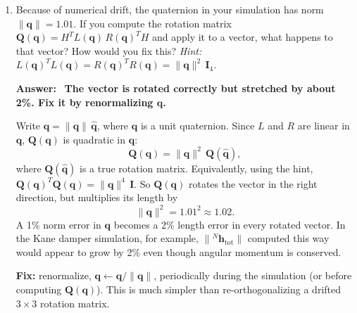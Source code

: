 \documentclass[11pt,letterpaper]{article}
\newenvironment{answer}{\par\vspace{4pt}\color{blue!60!black}\textbf{Answer:}\ }{\par\vspace{4pt}}
\begin{document}
\begin{enumerate}[label=\textbf{\arabic*.}, leftmargin=*, itemsep=4pt]
\begin{answer}
A unit quaternion must satisfy only $\lVert\mathbf{q}\rVert = 1$, a single constraint, leaving $4 - 1 = 3$ degrees of freedom.

Both match the 3 degrees of freedom of a rigid-body rotation. The quaternion is more compact and has only one constraint to maintain numerically.
\end{answer}

\item Because of numerical drift, the quaternion in your simulation has norm $\lVert\mathbf{q}\rVert = 1.01$. If you compute the rotation matrix $\mathbf{Q}(\mathbf{q}) = H^{T}L(\mathbf{q})\,R(\mathbf{q})^{T}H$ and apply it to a vector, what happens to that vector? How would you fix this? \emph{Hint:} $L(\mathbf{q})^{T}L(\mathbf{q}) = R(\mathbf{q})^{T}R(\mathbf{q}) = \lVert\mathbf{q}\rVert^2\,\mathbf{I}_4$.

\begin{answer}
\textbf{The vector is rotated correctly but stretched by about 2\%. Fix it by renormalizing $\mathbf{q}$.}

Write $\mathbf{q} = \lVert\mathbf{q}\rVert\,\hat{\mathbf{q}}$, where $\hat{\mathbf{q}}$ is a unit quaternion. Since $L$ and $R$ are linear in $\mathbf{q}$, $\mathbf{Q}(\mathbf{q})$ is quadratic in $\mathbf{q}$:
\[
\mathbf{Q}(\mathbf{q}) = \lVert\mathbf{q}\rVert^2\,\mathbf{Q}(\hat{\mathbf{q}}),
\]
where $\mathbf{Q}(\hat{\mathbf{q}})$ is a true rotation matrix. Equivalently, using the hint, $\mathbf{Q}(\mathbf{q})^{T}\mathbf{Q}(\mathbf{q}) = \lVert\mathbf{q}\rVert^4\,\mathbf{I}$. So $\mathbf{Q}(\mathbf{q})$ rotates the vector in the right direction, but multiplies its length by
\[
\lVert\mathbf{q}\rVert^2 = 1.01^2 \approx 1.02 .
\]
A 1\% norm error in $\mathbf{q}$ becomes a 2\% length error in every rotated vector. In the Kane damper simulation, for example, $\lVert{}^{N}\mathbf{h}_{\text{tot}}\rVert$ computed this way would appear to grow by 2\% even though angular momentum is conserved.

\textbf{Fix:} renormalize, $\mathbf{q} \leftarrow \mathbf{q}/\lVert\mathbf{q}\rVert$, periodically during the simulation (or before computing $\mathbf{Q}(\mathbf{q})$). This is much simpler than re-orthogonalizing a drifted $3\times3$ rotation matrix.
\end{answer}

\end{enumerate}
\end{document}
